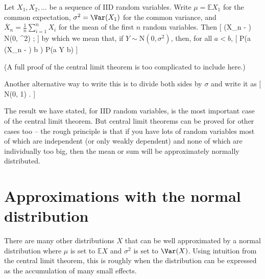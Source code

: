\documentclass[
  letterpaper,
  DIV=11,
  numbers=noendperiod]{scrreprt}
\theoremstyle{remark}
\begin{document}
\leavevmode{}%
Let \(X_1, X_2, \dots\) be a sequence of IID random variables. Write
\(\mu = \mathbb EX_1\) for the common expectation,
\(\sigma^2 = \Var(X_1)\) for the common variance, and
\(\overline X_n =\frac{1}{n} \sum_{i=1}^n X_i\) for the mean of the
first \(n\) random variables. Then {[} \big(\overline X\_n -
\mu\big) \to \mathrm N(0, \sigma\^{}2)
\quad {}; {]} by which we mean
that, if \(Y \sim \mathrm N(0, \sigma^2)\), then, for all \(a < b\), {[}
\mathbb P\left(a \leq {}\big(\overline X\_n - \mu\big) \leq b
\right) \to \mathbb P(a \leq Y \leq b) \quad {} {]}

(A full proof of the central limit theorem is too complicated to include
here.)

Another alternative way to write this is to divide both sides by
\(\sigma\) and write it as {[}
 \to \mathrm N(0, 1)
\quad {}. {]}

The result we have stated, for IID random variables, is the most
important case of the central limit theorem. But central limit theorems
can be proved for other cases too -- the rough principle is that if you
have lots of random variables most of which are independent (or only
weakly dependent) and none of which are individually too big, then the
mean or sum will be approximately normally distributed.

\hypertarget{normal-approx}{%
\section{Approximations with the normal
distribution}\label{normal-approx}}

There are many other distributions \(X\) that can be well approximated
by a normal distribution where \(\mu\) is set to \(\mathbb EX\) and
\(\sigma^2\) is set to \(\Var(X)\). Using intuition from the central
limit theorem, this is roughly when the distribution can be expressed as
the accumulation of many small effects.
\end{document}
